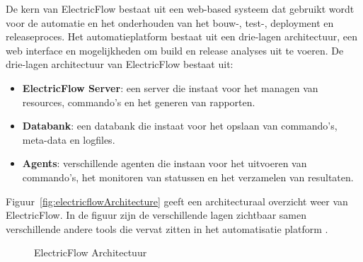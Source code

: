 De kern van ElectricFlow bestaat uit een web-based systeem dat gebruikt wordt voor de automatie en het onderhouden van het bouw-, test-, deployment en releaseproces.
Het automatieplatform bestaat uit een drie-lagen architectuur, een web interface en mogelijkheden om build en release analyses uit te voeren.
De drie-lagen architectuur van ElectricFlow bestaat uit:
\begin{itemize}
\item \textbf{ElectricFlow Server}: een server die instaat voor het managen van resources, commando's en het generen van rapporten.
\item \textbf{Databank}: een databank die instaat voor het opslaan van commando's, meta-data en logfiles.
\item \textbf{Agents}: verschillende agenten die instaan voor het uitvoeren van commando's, het monitoren van statussen en het verzamelen van resultaten.
\end{itemize}
Figuur~\vref{fig:electricflowArchitecture} geeft een architecturaal overzicht weer van ElectricFlow.
In de figuur zijn de verschillende lagen zichtbaar samen verschillende andere tools die vervat zitten in het automatisatie platform \citep{electricflow}.

\begin{figure}[!ht]
\centering
{}
\caption{ElectricFlow Architectuur \citep{electricflow}}
\label{fig:electricflowArchitecture}
\end{figure}

